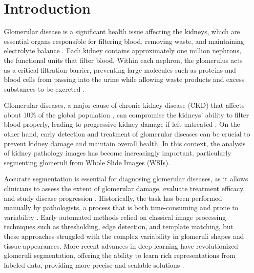 \section{Introduction}
Glomerular disease is a significant health issue affecting the kidneys, which are essential organs responsible for filtering blood, removing waste, and maintaining electrolyte balance \cite{thomas2006renal}.
Each kidney contains approximately one million nephrons, the functional units that filter blood. 
Within each nephron, the glomerulus acts as a critical filtration barrier, preventing large molecules such as proteins and blood cells from passing into the urine while allowing waste products and excess substances to be excreted \cite{clevelandclinic}.


Glomerular diseases, a major cause of chronic kidney disease (CKD) that affects about 10\% of the global population \cite{clinical_context}, can compromise the kidneys' ability to filter blood properly, leading to progressive kidney damage if left untreated \cite{clevelandclinic}.
On the other hand, early detection and treatment of glomerular diseases can be crucial to prevent kidney damage and maintain overall health. 
In this context, the analysis of kidney pathology images has become increasingly important, particularly segmenting glomeruli from Whole Slide Images (WSIs).


Accurate segmentation is essential for diagnosing glomerular diseases, as it allows clinicians to assess the extent of glomerular damage, evaluate treatment efficacy, and study disease progression  \cite{kaur2023automatic,jha2021instance} .
Historically, the task has been performed manually by pathologists, a process that is both time-consuming and prone to variability \cite{jiang_deep_2021}. 
Early automated methods relied on classical image processing techniques such as thresholding, edge detection, and template matching, but these approaches struggled with the complex variability in glomeruli shapes and tissue appearances. 
More recent advances in deep learning have revolutionized glomeruli segmentation, offering the ability to learn rich representations from labeled data, providing more precise and scalable solutions \cite{bouteldja2021deep,lutnick_user-friendly_2022,leng_accelerated_2023}.

